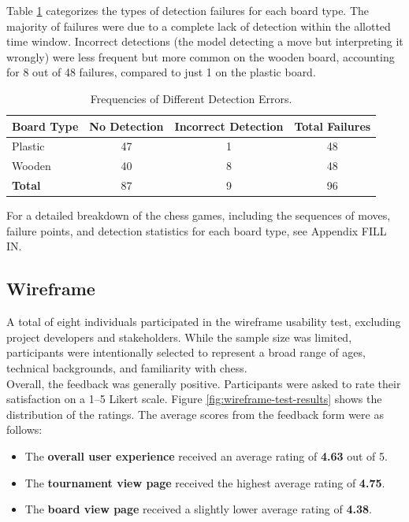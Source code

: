 Table \ref{tab:different-errors} categorizes the types of detection failures for each board type. The majority of failures were due to a complete lack of detection within the allotted time window. Incorrect detections (the model detecting a move but interpreting it wrongly) were less frequent but more common on the wooden board, accounting for 8 out of 48 failures, compared to just 1 on the plastic board.  \\

\begin{table}[htbp]
\centering
\caption[Different detection errors]{Frequencies of Different Detection Errors.}
\label{tab:different-errors}
\begin{tabular}{lccc}
\toprule
\textbf{Board Type} & \textbf{No Detection} & \textbf{Incorrect Detection} & \textbf{Total Failures} \\
\midrule
Plastic & 47 & 1 & 48 \\
Wooden & 40 & 8 & 48 \\
\midrule
\textbf{Total} & 87 & 9 & 96 \\
\bottomrule
\end{tabular}
\end{table}

For a detailed breakdown of the chess games, including the sequences of moves, failure points, and detection statistics for each board type, see Appendix FILL IN.

\subsection{Wireframe}
\label{subsec:wireframe-results}

A total of eight individuals participated in the wireframe usability test, excluding project developers and stakeholders. While the sample size was limited, participants were intentionally selected to represent a broad range of ages, technical backgrounds, and familiarity with chess. \\

Overall, the feedback was generally positive. Participants were asked to rate their satisfaction on a 1–5 Likert scale. Figure \ref{fig:wireframe-test-results} shows the distribution of the ratings. The average scores from the feedback form were as follows:

\begin{itemize}
    \item The \textbf{overall user experience} received an average rating of \textbf{4.63} out of 5.
    \item The \textbf{tournament view page} received the highest average rating of \textbf{4.75}.
    \item The \textbf{board view page} received a slightly lower average rating of \textbf{4.38}.
\end{itemize}

